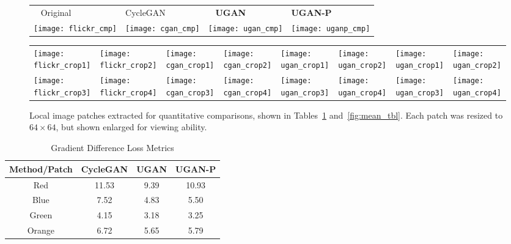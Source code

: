 \begin{figure*}[!ht]
\centering
\begin{tabular}{p{4.0cm} p{4.0cm} p{4.0cm} p{4.0cm}}
  
   \qquad \qquad ~ Original & \qquad \qquad CycleGAN & \qquad \qquad ~ \textbf{UGAN} & \qquad \qquad \textbf{UGAN-P} \\

   \texttt{[image: flickr\_cmp]} &
   \texttt{[image: cgan\_cmp]} &
   \texttt{[image: ugan\_cmp]} &
   \texttt{[image: uganp\_cmp]} \\ [-2ex]
   
\end{tabular}
\end{figure*}

\begin{figure*}[!ht]
\begin{tabular}{p{1.8cm} p{1.85cm} p{1.8cm} p{1.8cm} p{1.8cm} p{1.8cm} p{1.8cm} p{1.9cm} }
   
   \texttt{[image: flickr\_crop1]} &
   \texttt{[image: flickr\_crop2]} &
   \texttt{[image: cgan\_crop1]} &
   \texttt{[image: cgan\_crop2]} &
   \texttt{[image: ugan\_crop1]} &
   \texttt{[image: ugan\_crop2]} &
   \texttt{[image: ugan\_crop1]} &
   \texttt{[image: ugan\_crop2]} \\

   \texttt{[image: flickr\_crop3]} &
   \texttt{[image: flickr\_crop4]} &
   \texttt{[image: cgan\_crop3]} &
   \texttt{[image: cgan\_crop4]} &
   \texttt{[image: ugan\_crop3]} &
   \texttt{[image: ugan\_crop4]} &
   \texttt{[image: ugan\_crop3]} &
   \texttt{[image: ugan\_crop4]} \\

\end{tabular}
\caption{Local image patches extracted for quantitative comparisons, shown in Tables~\ref{fig:gdl_tbl} and~\ref{fig:mean_tbl}. 
Each patch was resized to $64 \times 64$, but shown enlarged for viewing ability.}
\label{fig:zoom}
\end{figure*}

\begin{table}[ht]
\footnotesize
\centering
\caption{Gradient Difference Loss Metrics}
\begin{tabular}{| c | c | c | c | }
   \hline
   Method/Patch & CycleGAN & \textbf{UGAN} & \textbf{UGAN-P} \\ \hline
   Red    & 11.53 & 9.39 & 10.93  \\ \hline
   Blue   & 7.52  & 4.83 &  5.50\\ \hline
   Green  & 4.15  & 3.18 & 3.25 \\ \hline
   Orange & 6.72  & 5.65 & 5.79 \\ \hline
\end{tabular}
\label{fig:gdl_tbl}
\end{table}

